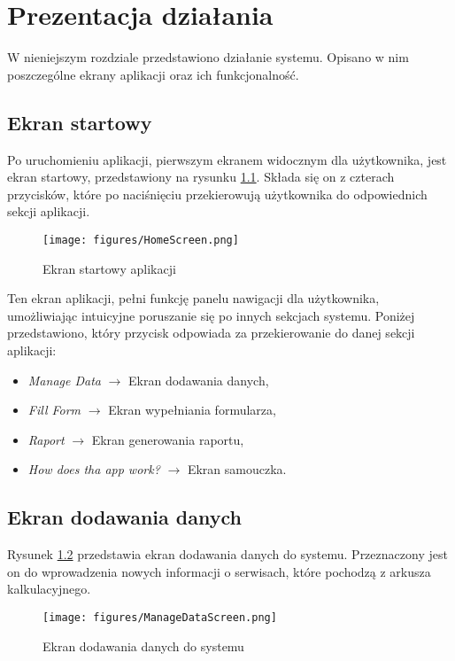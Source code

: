 \chapter{Prezentacja działania}
W nieniejszym rozdziale przedstawiono działanie systemu. Opisano w nim poszczególne ekrany aplikacji oraz ich funkcjonalność. 

\section{Ekran startowy}
Po uruchomieniu aplikacji, pierwszym ekranem widocznym dla użytkownika, jest ekran startowy, przedstawiony na rysunku \ref{fig:homescreen}. Składa się on z czterach przycisków, które po naciśnięciu przekierowują użytkownika do odpowiednich sekcji aplikacji.

 \begin{figure}[h]
     \centering
     \texttt{[image: figures/HomeScreen.png]}
     \caption{Ekran startowy aplikacji} 
     \label{fig:homescreen}
 \end{figure}

 Ten ekran aplikacji, pełni funkcję panelu nawigacji dla użytkownika, umożliwiając intuicyjne poruszanie się po innych sekcjach systemu.
Poniżej przedstawiono, który przycisk odpowiada za przekierowanie do danej sekcji aplikacji:
\begin{itemize}
    \item \emph{Manage Data} $\rightarrow$ Ekran dodawania danych,
    \item \emph{Fill Form} $\rightarrow$ Ekran wypełniania formularza,
    \item \emph{Raport} $\rightarrow$ Ekran generowania raportu,
    \item \emph{How does tha app work?} $\rightarrow$ Ekran samouczka.
\end{itemize}


 \section{Ekran dodawania danych}
 Rysunek \ref{fig:managedatascreen} przedstawia ekran dodawania danych do systemu. Przeznaczony jest on do wprowadzenia nowych informacji o serwisach, które pochodzą z arkusza kalkulacyjnego.
  \begin{figure}[H]
     \centering
     \texttt{[image: figures/ManageDataScreen.png]}
     \caption{Ekran dodawania danych do systemu} 
     \label{fig:managedatascreen}
 \end{figure}

